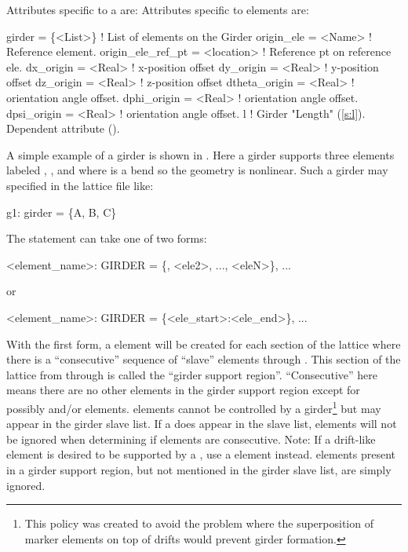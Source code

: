 Attributes specific to a  are:
Attributes specific to  elements are:
\begin{example}
  girder = \{<List>\}   ! List of elements on the Girder
  origin_ele        = <Name>     ! Reference element.
  origin_ele_ref_pt = <location> ! Reference pt on reference ele.
  dx_origin         = <Real>     ! x-position offset
  dy_origin         = <Real>     ! y-position offset
  dz_origin         = <Real>     ! z-position offset
  dtheta_origin     = <Real>     ! orientation angle offset.
  dphi_origin       = <Real>     ! orientation angle offset.
  dpsi_origin       = <Real>     ! orientation angle offset.
  l                 ! Girder "Length" (\ref{s:l}). Dependent attribute ().
\end{example}

A simple example of a girder is shown in . Here a girder supports three
elements labeled , , and  where  is a bend so the geometry is
nonlinear. Such a girder may specified in the lattice file like:
\begin{example}
  g1: girder = \{A, B, C\}
\end{example}

The  statement can take one of two forms:
\begin{example}
  <element_name>: GIRDER = \{<ele1>, <ele2>, ..., <eleN>\}, ... 
\end{example}
or
\begin{example}
  <element_name>: GIRDER = \{<ele_start>:<ele_end>\}, ... 
\end{example}

With the first form, a  element will be created for each section of the lattice where
there is a ``consecutive'' sequence of ``slave'' elements  through .  This
section of the lattice from  through  is called the ``girder support region''.
``Consecutive'' here means there are no other elements in the girder support region except for
possibly  and/or  elements.  elements cannot be controlled by a
girder\footnote{This policy was created to avoid the problem where the superposition of marker
elements on top of drifts would prevent girder formation.} but may appear in the girder slave
list. If a  does appear in the slave list,  elements will not be ignored when
determining if elements are consecutive. Note: If a drift-like element is desired to be supported by
a , use a  element instead.  elements present in a girder support
region, but not mentioned in the girder slave list, are simply ignored.

